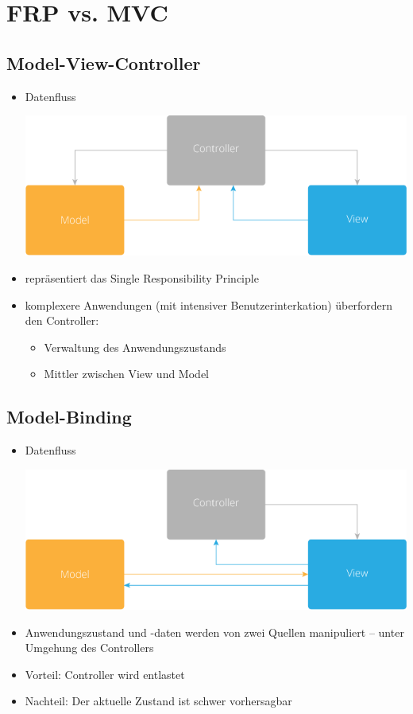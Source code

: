 \documentclass[a4paper]{article}
\begin{document}
\section*{FRP vs. MVC}
\label{sec:org3a4ef0e}
\cite{Ferreira19}
\subsection*{Model-View-Controller}
\label{sec:org0e69eda}
\begin{itemize}
\item Datenfluss
\begin{center}
\includegraphics[width=.9\linewidth]{./Abbildungen/mvc.png}
\end{center}
\item repräsentiert das Single Responsibility Principle
\item komplexere Anwendungen (mit intensiver Benutzerinterkation)
überfordern den Controller:
\begin{itemize}
\item Verwaltung des Anwendungszustands
\item Mittler zwischen View und Model
\end{itemize}
\end{itemize}
\subsection*{Model-Binding}
\label{sec:org07c8c81}
\begin{itemize}
\item Datenfluss
\begin{center}
\includegraphics[width=.9\linewidth]{./Abbildungen/model-binding.png}
\end{center}
\item Anwendungszustand und -daten werden von zwei Quellen manipuliert --
unter Umgehung des Controllers
\item Vorteil: Controller wird entlastet
\item Nachteil: Der aktuelle Zustand ist schwer vorhersagbar
\end{itemize}
\end{document}
